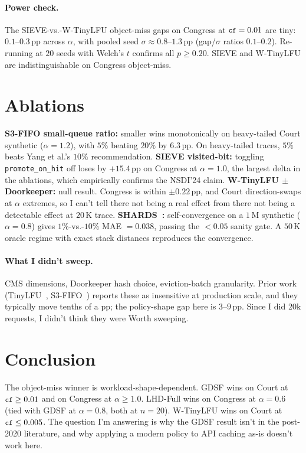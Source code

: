\documentclass[letterpaper,twocolumn,10pt]{article}
\newcommand{\code}[1]{\texttt{\small #1}}
\begin{document}
\paragraph{Power check.} The SIEVE-vs.-W-TinyLFU object-miss gaps
on Congress at $\code{cf}=0.01$ are tiny: $0.1$--$0.3$\,pp across
$\alpha$, with pooled seed $\sigma \approx 0.8$--$1.3$\,pp
(gap/$\sigma$ ratios $0.1$--$0.2$). Re-running at $20$ seeds with
Welch's $t$ confirms all $p \geq 0.20$. SIEVE and W-TinyLFU are
indistinguishable on Congress object-miss.
\section{Ablations}\label{sec:ablations}
\textbf{S3-FIFO
small-queue ratio:} smaller wins monotonically on heavy-tailed
Court synthetic ($\alpha=1.2$), with $5\%$ beating $20\%$ by
$6.3$\,pp. On heavy-tailed traces, $5\%$ beats Yang et al.'s
$10\%$ recommendation. \textbf{SIEVE visited-bit:} toggling
\texttt{promote\_on\_hit} off loses by $+15.4$\,pp on Congress at
$\alpha=1.0$, the largest delta in the ablations, which
empirically confirms the NSDI'24 claim. \textbf{W-TinyLFU $\pm$
Doorkeeper:} null result. Congress is within $\pm 0.22$\,pp, and
Court direction-swaps at $\alpha$ extremes, so I can't tell
there not being a real effect from there not being a detectable effect at $20$\,K trace.
\textbf{SHARDS~\cite{waldspurger2015shards}:} self-convergence on
a $1$\,M synthetic ($\alpha=0.8$) gives $1\%$-vs.-$10\%$
MAE $=0.038$, passing the $<0.05$ sanity gate. A $50$\,K oracle
regime with exact stack distances reproduces the convergence.
\paragraph{What I didn't sweep.} CMS dimensions, Doorkeeper hash
choice, eviction-batch granularity. Prior work
(TinyLFU~\cite{einziger2017tinylfu}, S3-FIFO~\cite{yang2023fifo})
reports these as insensitive at production scale, and they
typically move tenths of a pp; the policy-shape gap here is
$3$--$9$\,pp. Since I did 20k requests, I didn't think they were Worth sweeping.
\section{Conclusion}\label{sec:conclusion}
The object-miss winner is workload-shape-dependent. GDSF wins on
Court at $\code{cf} \geq 0.01$ and on Congress at $\alpha \geq 1.0$.
LHD-Full wins on Congress at $\alpha = 0.6$ (tied with GDSF at
$\alpha=0.8$, both at $n{=}20$). W-TinyLFU wins on Court at
$\code{cf} \leq 0.005$. The question I'm answering is why the GDSF result isn't in the post-2020 literature, and why applying a
modern policy to API caching as-is doesn't work here.
\end{document}
